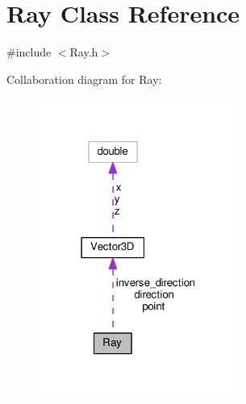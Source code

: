 \hypertarget{classRay}{}\section{Ray Class Reference}
\label{classRay}


{\ttfamily \#include $<$Ray.\+h$>$}



Collaboration diagram for Ray\+:\nopagebreak
\begin{figure}[H]
\begin{center}
\leavevmode
\includegraphics[width=186pt]{classRay__coll__graph}
\end{center}
\end{figure}

